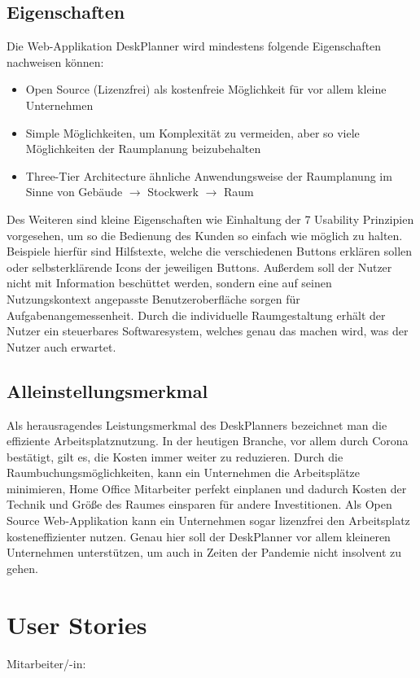 \documentclass{article}
\begin{document}
\subsection{Eigenschaften}
Die Web-Applikation DeskPlanner wird mindestens folgende Eigenschaften nachweisen können:

\begin{itemize}
    \item Open Source (Lizenzfrei) als kostenfreie Möglichkeit für vor allem kleine Unternehmen
    \item Simple Möglichkeiten, um Komplexität zu vermeiden, aber so viele Möglichkeiten der Raumplanung beizubehalten
    \item Three-Tier Architecture ähnliche Anwendungsweise der Raumplanung im Sinne von Gebäude $\rightarrow$ Stockwerk $\rightarrow$ Raum 
\end{itemize}

Des Weiteren sind kleine Eigenschaften wie Einhaltung der 7 Usability Prinzipien vorgesehen, um so die Bedienung des Kunden so einfach wie möglich zu halten. 
Beispiele hierfür sind Hilfstexte, welche die verschiedenen Buttons erklären sollen oder selbsterklärende Icons der jeweiligen Buttons. 
Außerdem soll der Nutzer nicht mit Information beschüttet werden, sondern eine auf seinen Nutzungskontext angepasste Benutzeroberfläche sorgen für Aufgabenangemessenheit. 
Durch die individuelle Raumgestaltung erhält der Nutzer ein steuerbares Softwaresystem, welches genau das machen wird, was der Nutzer auch erwartet.

\subsection{Alleinstellungsmerkmal}
Als herausragendes Leistungsmerkmal des DeskPlanners bezeichnet man die effiziente Arbeitsplatznutzung. 
In der heutigen Branche, vor allem durch Corona bestätigt, gilt es, die Kosten immer weiter zu reduzieren. 
Durch die Raumbuchungsmöglichkeiten, kann ein Unternehmen die Arbeitsplätze minimieren, Home Office Mitarbeiter perfekt einplanen und dadurch Kosten der Technik und Größe des Raumes einsparen für andere Investitionen. 
Als Open Source Web-Applikation kann ein Unternehmen sogar lizenzfrei den Arbeitsplatz kosteneffizienter nutzen.
Genau hier soll der DeskPlanner vor allem kleineren Unternehmen unterstützen, um auch in Zeiten der Pandemie nicht insolvent zu gehen.

\section{User Stories}
Mitarbeiter/-in:
\end{document}
